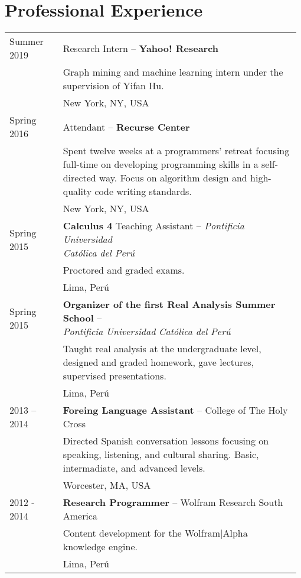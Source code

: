 \documentclass[12pt,]{scrartcl}
\begin{document}
\section{Professional Experience}\label{experience}
\begin{table}[h]
{\def\arraystretch{1.5}\tabcolsep=0pt
\begin{tabular}{p{0.18\linewidth}p{0.8\linewidth}}

Summer 2019 & Research Intern -- \textbf{Yahoo! Research} \\
& Graph mining and machine learning intern under the supervision of Yifan Hu. \\
& New York, NY, USA \\

Spring 2016 & Attendant -- \textbf{Recurse Center} \\
& Spent twelve weeks at a programmers' retreat focusing full-time on developing programming skills in a self-directed way. Focus on algorithm design and high-quality code writing standards. \\
& New York, NY, USA \\

Spring 2015 & \makecell[l]{\textbf{Calculus 4} Teaching Assistant -- \textit{Pontificia Universidad} \\ \textit{Católica del Perú}} \\
& Proctored and graded exams. \\
& Lima, Perú \\

Spring 2015 & \makecell[l]{\textbf{Organizer of the first Real Analysis Summer School} -- \\ \textit{Pontificia Universidad Católica del Perú}} \\ 
& Taught real analysis at the undergraduate level, designed and graded homework, gave lectures, supervised presentations. \\
& Lima, Perú \\

2013 -- 2014 & \textbf{Foreing Language Assistant} -- College of The Holy Cross \\ & Directed Spanish conversation lessons focusing on speaking, listening, and cultural sharing. Basic, intermadiate, and advanced levels. \\
& Worcester, MA, USA \\

2012 - 2014 & \textbf{Research Programmer} -- Wolfram Research South America \\
& Content development for the Wolfram|Alpha knowledge engine. \\
& Lima, Perú\\

\end{tabular}
}
\end{table}
\end{document}
